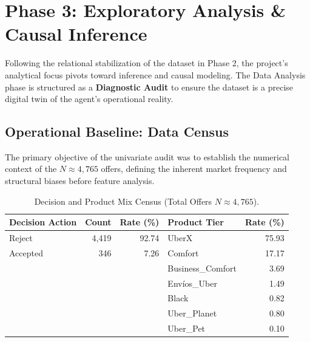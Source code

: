 
\section{Phase 3: Exploratory Analysis \& Causal Inference}

Following the relational stabilization of the dataset in Phase 2, the project's analytical focus pivots toward inference and causal modeling. The Data Analysis phase is structured as a \textbf{Diagnostic Audit} to ensure the dataset is a precise digital twin of the agent's operational reality.

\subsection{Operational Baseline: Data Census}
The primary objective of the univariate audit was to establish the numerical context of the $N \approx 4,765$ offers, defining the inherent market frequency and structural biases before feature analysis.

\begin{table}[H]
    \centering
    \small
    \begin{tabularx}{\textwidth}{l r r | l r}
        \toprule
        \textbf{Decision Action} & \textbf{Count} & \textbf{Rate (\%)} & \textbf{Product Tier} & \textbf{Rate (\%)} \\
        \midrule
        Reject & 4,419 & 92.74 & UberX & 75.93 \\
        Accepted & 346 & 7.26 & Comfort & 17.17 \\
        & & & Business\_Comfort & 3.69 \\
        & & & Envíos\_Uber & 1.49 \\
        & & & Black & 0.82 \\
        & & & Uber\_Planet & 0.80 \\
        & & & Uber\_Pet & 0.10 \\
        \bottomrule
    \end{tabularx}
    \caption{Decision and Product Mix Census (Total Offers $N \approx 4,765$).}
    \label{tab:decision_census}
\end{table}

